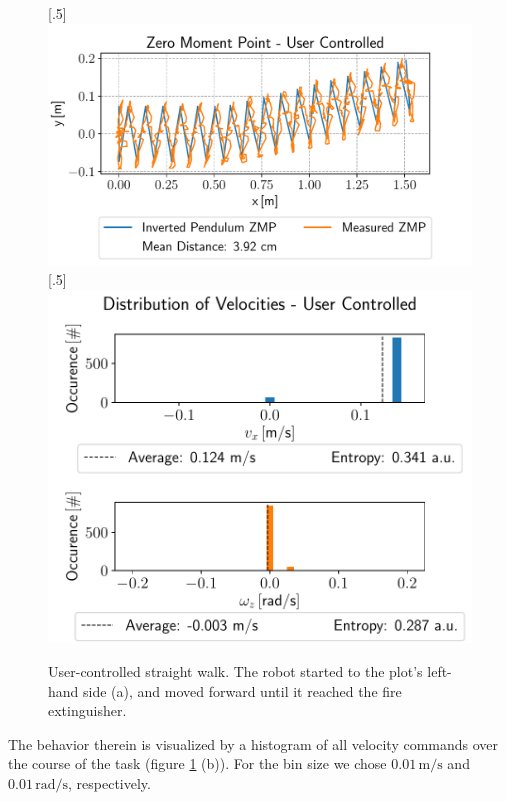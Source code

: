 \begin{figure}[h!]
	[.5\linewidth]{\includegraphics[scale=.45]{chapters/04_experiments/01_user_controlled_walking/02_test_environment/straight_walk_01_zmp.pdf}}
	[.5\linewidth]{\includegraphics[scale=.45]{chapters/04_experiments/01_user_controlled_walking/02_test_environment/straight_walk_01_entropy.pdf}}
	\caption{User-controlled straight walk. The robot started to the plot's left-hand side (a), and moved forward until it reached the fire extinguisher.}
	\label{fig::412_uc_straight}
\end{figure} 
The behavior therein is visualized by a histogram of all velocity commands over the course of the task (figure \ref{fig::412_uc_straight} (b)). For the bin size we chose $0.01\,\text{m}/\text{s}$ and $0.01\,\text{rad}/\text{s}$, respectively. 

